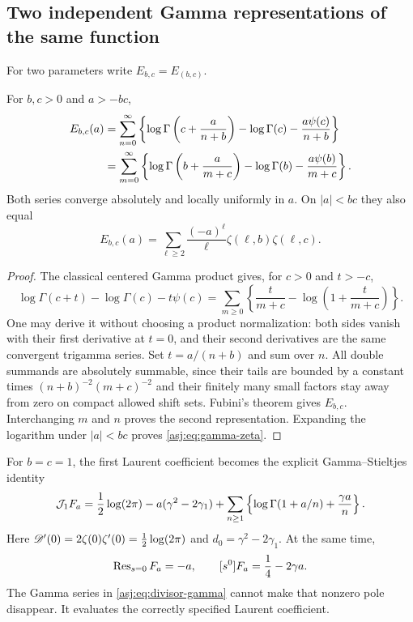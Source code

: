 \subsection{Two independent Gamma representations of the same function}
For two parameters write $E_{b,c}=E_{(b,c)}$.

\begin{theorem}\label{asj:thm:gamma}
For $b,c>0$ and $a>-bc$,
\begin{align}\label{asj:eq:gamma-reciprocity}
 E_{b,c}(a)
 &=\sum_{n=0}^{\infty}\left\{
       \log\Gamma\left(c+\frac a{n+b}\right)-\log\Gamma(c)
                      -\frac{a\psi(c)}{n+b}\right\}\notag\\
 &=\sum_{m=0}^{\infty}\left\{
       \log\Gamma\left(b+\frac a{m+c}\right)-\log\Gamma(b)
                      -\frac{a\psi(b)}{m+c}\right\}.
\end{align}
Both series converge absolutely and locally uniformly in $a$. On
$|a|<bc$ they also equal
\begin{equation}\label{asj:eq:gamma-zeta}
 E_{b,c}(a)=\sum_{\ell\ge2}
                 \frac{(-a)^\ell}{\ell}\zeta(\ell,b)\zeta(\ell,c).
\end{equation}
\end{theorem}
\begin{proof}
The classical centered Gamma product gives, for $c>0$ and $t>-c$,
\begin{equation}\label{asj:eq:centeredgamma}
 \log\Gamma(c+t)-\log\Gamma(c)-t\psi(c)
    =\sum_{m\ge0}\left\{\frac{t}{m+c}
                         -\log\left(1+\frac t{m+c}\right)\right\}.
\end{equation}
One may derive it without choosing a product normalization: both sides
vanish with their first derivative at $t=0$, and their second derivatives
are the same convergent trigamma series. Set $t=a/(n+b)$ and sum over
$n$. All double summands are absolutely summable, since their tails are
bounded by a constant times $(n+b)^{-2}(m+c)^{-2}$ and their finitely many
small factors stay away from zero on compact allowed shift sets.
Fubini's theorem gives $E_{b,c}$. Interchanging $m$ and $n$ proves the
second representation. Expanding the logarithm under $|a|<bc$ proves
\eqref{asj:eq:gamma-zeta}.
\end{proof}

For $b=c=1$, the first Laurent coefficient becomes the explicit
Gamma--Stieltjes identity
\begin{equation}\label{asj:eq:divisor-gamma}
 \mathcal J_1F_a=\frac12\log(2\pi)-a(\gamma^2-2\gamma_1)
      +\sum_{n\ge1}\left\{\log\Gamma(1+a/n)+\frac{\gamma a}{n}\right\}.
\end{equation}
Here $\mathscr D'(0)=2\zeta(0)\zeta'(0)=\tfrac12\log(2\pi)$ and
$d_0=\gamma^2-2\gamma_1$. At the same time,
\[
 \operatorname{Res}_{s=0}F_a=-a,\qquad [s^0]F_a=\frac14-2\gamma a.
\]
The Gamma series in \eqref{asj:eq:divisor-gamma} cannot make that nonzero pole
 disappear. It evaluates the correctly specified Laurent coefficient.

